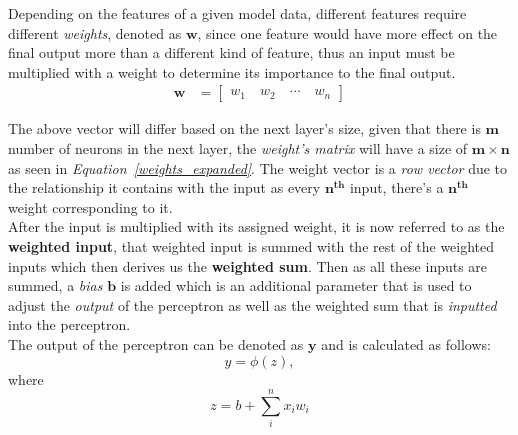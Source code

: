 \documentclass[12pt]{extarticle}
\begin{document}
	Depending on the features of a given model data, different features require different \emph{weights}, denoted as $\bm{w}$, since one feature would have more effect on the final output more than a different kind of feature, thus an input must be multiplied with a weight to determine its importance to the final output.
	\begin{align}
		\bm{w} &= \begin{bmatrix}\label{weights}
			w_1 \quad
			w_2 \quad
			\cdots \quad
			w_n
		\end{bmatrix}
	\end{align}
	
	The above vector will differ based on the next layer's size, given that there is $\bm{m}$ number of neurons in the next layer, the \emph{weight's matrix} will have a size of $\bm{m \times n}$ as seen in \emph{Equation~\ref{weights_expanded}}. The weight vector is a \emph{row vector} due to the relationship it contains with the input as every $\bm{n^{th}}$ input, there's a $\bm{n^{th}}$ weight corresponding to it.\\[5mm]
	After the input is multiplied with its assigned weight, it is now referred to as the \textbf{weighted input}, that weighted input is summed with the rest of the weighted inputs which then derives us the \textbf{weighted sum}. Then as all these inputs are summed, a \emph{bias} $\bm{b}$ is added which is an additional parameter that is used to adjust the \emph{output} of the perceptron as well as the weighted sum that is \emph{inputted} into the perceptron.\\[5mm]
	The output of the perceptron can be denoted as $\bm{y}$ and is calculated as follows:
	\begin{equation}\label{output}
		y = \phi{(z)},
	\end{equation}
	where
	\begin{equation}\label{z}
		z = b + \sum_{i}^{n} x_i w_i
	\end{equation}
	
\end{document}
